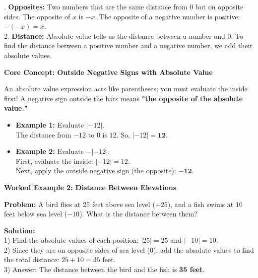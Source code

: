 \documentclass[12pt, letterpaper, fleqn]{article}
\begin{document}
\vspace{3mm}

. \textbf{Opposites:} Two numbers that are the same distance from 0 but on opposite sides. The opposite of $x$ is $-x$. The opposite of a negative number is positive: $-(-x) = x$. \\
2. \textbf{Distance:} Absolute value tells us the distance between a number and 0. To find the distance between a positive number and a negative number, we add their absolute values.

\vspace{4mm}

\begin{tcolorbox}[colback=white, colframe=black!25, boxrule=0.6pt, arc=4mm, left=6mm, right=6mm, top=4mm, bottom=4mm]
\vspace{0.5cm}
\textbf{Core Concept: Outside Negative Signs with Absolute Value}
\vspace{0.5cm}

\medskip
An absolute value expression acts like parentheses; you must evaluate the inside first! A negative sign outside the bars means \textbf{"the opposite of the absolute value."}

\begin{itemize}[itemsep=6pt]
    \item \textbf{Example 1:} Evaluate $|-12|$. 
    \\ The distance from $-12$ to $0$ is $12$. So, $|-12| = \mathbf{12}$.
    
    \item \textbf{Example 2:} Evaluate $-|-12|$.
    \\ First, evaluate the inside: $|-12| = 12$. 
    \\ Next, apply the outside negative sign (the opposite): $\mathbf{-12}$.
\end{itemize}
\vspace{0.5cm}
\end{tcolorbox}

\vspace{4mm}

\begin{tcolorbox}[colback=white, colframe=black!25, boxrule=0.6pt, arc=4mm, left=6mm, right=6mm, top=5mm, bottom=5mm]

\textbf{Worked Example 2: Distance Between Elevations}
\vspace{0.5cm}

\medskip
\noindent
\textbf{Problem:} A bird flies at 25 feet above sea level ($+25$), and a fish swims at 10 feet below sea level ($-10$). What is the distance between them?

\vspace{0.5cm}

\medskip
\noindent
\textbf{Solution:} \\
1) Find the absolute values of each position: $|25| = 25$ and $|-10| = 10$. \\
2) Since they are on opposite sides of sea level (0), add the absolute values to find the total distance: $25 + 10 = 35$ feet. \\
3) Answer: The distance between the bird and the fish is \textbf{35 feet}.
\end{tcolorbox}
\end{document}
